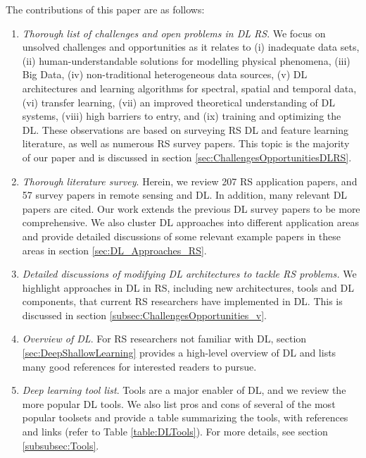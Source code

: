 \documentclass[12pt]{spieman}
\newcommand{\ParSection}[1]{}
\begin{document}
\begin{spacing}{1}
\ParSection{Paper Contributions (JOHN-DONE)} The contributions of this paper are as follows:\\

%
%
\begin{enumerate}

\item \textit{Thorough list of challenges and open problems in DL RS}. We focus on unsolved challenges and opportunities as it relates to (i) inadequate data sets, (ii) human-understandable solutions for modelling physical phenomena, (iii) Big Data, (iv) non-traditional heterogeneous data sources, (v) DL architectures and learning algorithms for spectral, spatial and temporal data, (vi) transfer learning, (vii) an improved theoretical understanding of DL systems, (viii) high barriers to entry, and (ix) training and optimizing the DL. These observations are based on surveying RS DL and feature learning literature, as well as numerous RS survey papers. This topic is the majority of our paper and is discussed in section \ref{sec:ChallengesOpportunitiesDLRS}.

\item \textit{Thorough literature survey}. Herein, we review 207 RS application papers, and 57 survey papers in remote sensing and DL. In addition, many relevant DL papers are cited. Our work extends the previous DL survey papers \cite{Cheng, Deng2014, Zhang2016} to be more comprehensive. We also cluster DL approaches into different application areas and provide detailed discussions of some relevant example papers in these areas in section \ref{sec:DL_Approaches_RS}.

\item \textit{Detailed discussions of modifying DL architectures to tackle RS problems.} We highlight approaches in DL in RS, including new architectures, tools and DL components, that current RS researchers have implemented in DL. This is discussed in section \ref{subsec:ChallengesOpportunities_v}.

\item \textit{Overview of DL}. For RS researchers not familiar with DL, section \ref{sec:DeepShallowLearning} provides a high-level overview of DL and lists many good references for interested readers to pursue.

\item \textit{Deep learning tool list}. Tools are a major enabler of DL, and we review the more popular DL tools. We also list pros and cons of several of the most popular toolsets and provide a table summarizing the tools, with references and links (refer to Table \ref{table:DLTools}). For more details, see section \ref{subsubsec:Tools}.


\end{enumerate}
\end{spacing}
\end{document}
